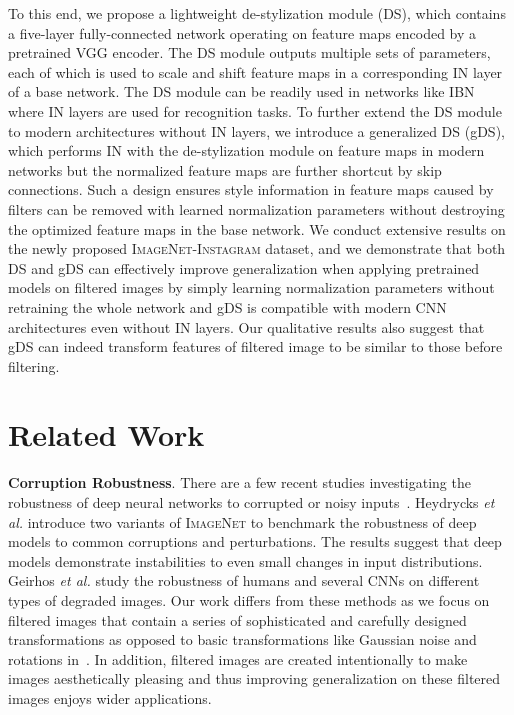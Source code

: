 \documentclass[letterpaper]{article} %
\newcommand{\instagram}{{\scshape ImageNet-Instagram}\xspace}
\newcommand{\imagenet}{{\scshape ImageNet}\xspace}
\newcommand{\system}{DS\xspace}
\newcommand{\gsystem}{gDS\xspace}
\begin{document}
To this end, we propose a lightweight de-stylization module (DS), which contains a five-layer fully-connected network operating on feature maps encoded by a pretrained VGG encoder. The DS module outputs multiple sets of parameters, each of which is used to scale and shift feature maps in a corresponding IN layer of a base network. The DS module can be readily used in networks like IBN~\cite{pan2018two} where IN layers are used for recognition tasks. To further extend the DS module to modern architectures without IN layers, we introduce a generalized DS (\gsystem), which performs IN with the de-stylization module on feature maps in modern networks but the normalized feature maps are further shortcut by skip connections. Such a design ensures style information in feature maps caused by filters can be removed with learned normalization parameters without destroying the optimized feature maps in the base network. We conduct extensive results on the newly proposed \instagram dataset, and we demonstrate that both \system and \gsystem can effectively improve generalization when applying pretrained models on filtered images by simply learning normalization parameters without retraining the whole network and \gsystem is compatible with modern CNN architectures even without IN layers. Our qualitative results also suggest that \gsystem can indeed transform features of filtered image to be similar to those before filtering.

\section{Related Work}
\textbf{Corruption Robustness}. There are a few recent studies investigating the robustness of deep neural networks to corrupted or noisy inputs~\cite{hendrycks2018benchmarking,geirhos2018generalisation}.
Heydrycks \textit{et al.} \cite{hendrycks2018benchmarking} introduce two variants of \imagenet to benchmark the robustness of deep models to common corruptions and perturbations.
The results suggest that deep models demonstrate instabilities to even small changes in input distributions.
Geirhos \textit{et al.} \cite{geirhos2018generalisation} study the robustness of humans and several CNNs on different types of degraded images. Our work differs from these methods as we focus on filtered images that contain a series of sophisticated and carefully designed transformations as opposed to basic transformations like Gaussian noise and rotations in~\cite{hendrycks2018benchmarking,geirhos2018generalisation}.
In addition, filtered images are created intentionally to make images aesthetically pleasing and thus improving generalization on these filtered images enjoys wider applications.
\end{document}
